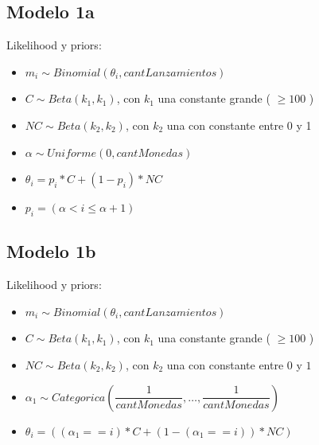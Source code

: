 \documentclass[a4paper]{article}
\begin{document}
\subsection{Modelo 1a}
\newline
Likelihood y priors: \\
\begin{itemize}
	\item $ m_i \sim Binomial(\theta_i, cantLanzamientos) $
	\item $ C \sim Beta(k_1, k_1) $, con $k_1$ una constante grande ( $\geq 100 $ )
	\item $ NC \sim Beta(k_2, k_2) $, con $k_2$ una con constante entre 0 y 1 
	\item $ \alpha \sim Uniforme(0,cantMonedas) $
	\item $ \theta_i = p_i * C + (1 - p_i) * NC $
	\item $ p_i = (\alpha < i \leq \alpha + 1) $
\end{itemize}



\subsection{Modelo 1b}
\newline
Likelihood y priors: \\
\begin{itemize}
	\item $ m_i \sim Binomial(\theta_i, cantLanzamientos) $
	\item $ C \sim Beta(k_1, k_1) $, con $k_1$ una constante grande ( $\geq 100 $ )
	\item $ NC \sim Beta(k_2, k_2) $, con $k_2$ una con constante entre $0$ y $1$
	\item $ \alpha_1 \sim Categorica(\dfrac{1}{cantMonedas}, \dots , \dfrac{1}{cantMonedas}) $
	\item $ \theta_i = ((\alpha_1==i) * C + (1 - (\alpha_1==i)) * NC) $

\end{itemize}
\end{document}
